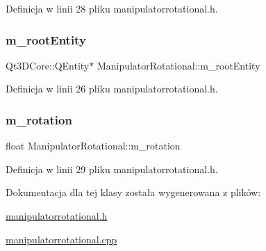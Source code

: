 Definicja w linii 28 pliku manipulatorrotational.\+h.

\mbox{\label{class_manipulator_rotational_a826543721395f9b5b7faa57caebe9a08}} 
\subsubsection{\texorpdfstring{m\+\_\+root\+Entity}{m\_rootEntity}}
{\footnotesize\ttfamily Qt3\+D\+Core\+::\+Q\+Entity$\ast$ Manipulator\+Rotational\+::m\+\_\+root\+Entity\hspace{0.3cm}{\ttfamily [protected]}}



Definicja w linii 26 pliku manipulatorrotational.\+h.

\mbox{\label{class_manipulator_rotational_a6edaea6ee8740b4a517f49f65ddf229d}} 
\subsubsection{\texorpdfstring{m\+\_\+rotation}{m\_rotation}}
{\footnotesize\ttfamily float Manipulator\+Rotational\+::m\+\_\+rotation\hspace{0.3cm}{\ttfamily [protected]}}



Definicja w linii 29 pliku manipulatorrotational.\+h.



Dokumentacja dla tej klasy została wygenerowana z plików\+:\begin{DoxyCompactItemize}
\item 
\hyperlink{manipulatorrotational_8h}{manipulatorrotational.\+h}\item 
\hyperlink{manipulatorrotational_8cpp}{manipulatorrotational.\+cpp}\end{DoxyCompactItemize}
